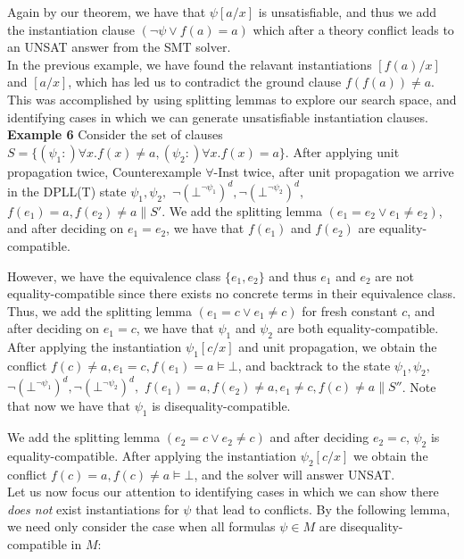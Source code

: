 \documentclass{llncs}
\begin{document}
Again by our theorem, we have that $\psi[ a/x ]$ is unsatisfiable, and thus we add the instantiation clause $( \neg \psi \vee f( a ) = a )$ which after a theory conflict leads to an UNSAT answer from the SMT solver. \\

In the previous example, we have found the relavant instantiations $[f(a)/x]$ and $[a/x]$, which has led us to contradict the ground clause $f( f( a ) ) \neq a$.
This was accomplished by using splitting lemmas to explore our search space, and identifying cases in which we can generate unsatisfiable instantiation clauses. \\

{\bf Example 6}
Consider the set of clauses $S = \{ (\psi_1 :)\forall x. f(x) \neq a, (\psi_2 :)\forall x. f(x) = a \}$.
After applying unit propagation twice, Counterexample $\forall$-Inst twice, after unit propagation we arrive in the DPLL(T) state $\psi_1, \psi_2,$ $\neg (\bot^{\neg \psi_1})^d, \neg (\bot^{\neg \psi_2})^d,$ $f(e_1) = a, f(e_2) \neq a \parallel S'$.
We add the splitting lemma $( e_1 = e_2 \vee e_1 \neq e_2 )$, and after deciding on $e_1 = e_2$, we have that $f( e_1 )$ and $f( e_2 )$ are equality-compatible.

However, we have the equivalence class $\{ e_1, e_2 \}$ and thus $e_1$ and $e_2$ are not equality-compatible since there exists no concrete terms in their equivalence class.
Thus, we add the splitting lemma $( e_1 = c \vee e_1 \neq c )$ for fresh constant $c$, and after deciding on $e_1 = c$, we have that $\psi_1$ and $\psi_2$ are both equality-compatible.
After applying the instantiation $\psi_1[c/x]$ and unit propagation, we obtain the conflict $f(c) \neq a, e_1 = c, f( e_1 ) = a \models \bot$, and backtrack to the state $\psi_1, \psi_2,$ $\neg (\bot^{\neg \psi_1})^d, \neg (\bot^{\neg \psi_2})^d,$ $f(e_1) = a, f(e_2) \neq a, e_1 \neq c, f( c ) \neq a \parallel S''$.
Note that now we have that $\psi_1$ is disequality-compatible.

We add the splitting lemma $( e_2 = c \vee e_2 \neq c )$ and after deciding $e_2 = c$, $\psi_2$ is equality-compatible.
After applying the instantiation $\psi_2[c/x]$ we obtain the conflict $f( c ) = a, f( c ) \neq a \models \bot$, and the solver will answer UNSAT. \\

Let us now focus our attention to identifying cases in which we can show there \emph{does not} exist instantiations for $\psi$ that lead to conflicts.
By the following lemma, we need only consider the case when all formulas $\psi \in M$ are disequality-compatible in $M$:
\end{document}
